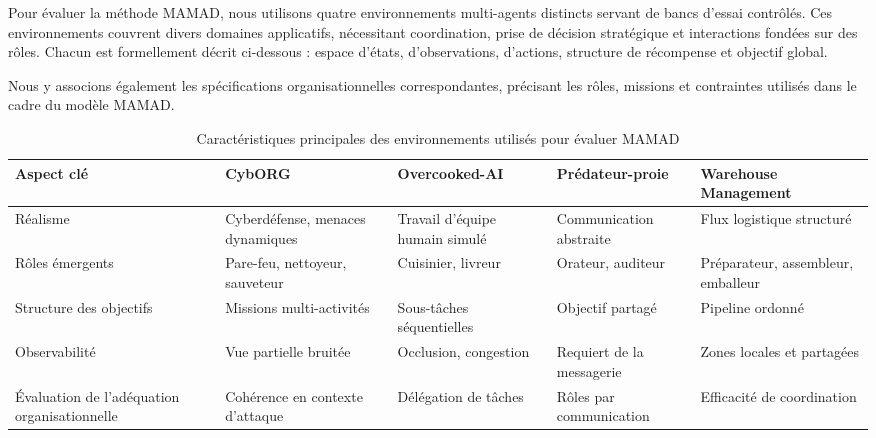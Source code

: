 Pour évaluer la méthode MAMAD, nous utilisons quatre environnements multi-agents distincts servant de bancs d'essai contrôlés. Ces environnements couvrent divers domaines applicatifs, nécessitant coordination, prise de décision stratégique et interactions fondées sur des rôles. Chacun est formellement décrit ci-dessous : espace d'états, d'observations, d'actions, structure de récompense et objectif global.

Nous y associons également les spécifications organisationnelles correspondantes, précisant les rôles, missions et contraintes utilisés dans le cadre du modèle MAMAD.

\vspace{0.5em}
\begin{table}[h!]
    \centering
    \begin{footnotesize}
        \renewcommand{\arraystretch}{1.3}
        \begin{tabular}{p{2.5cm}p{2.2cm}p{2.2cm}p{2.2cm}p{2.2cm}}
            \hline
            \textbf{Aspect clé}                          & \textbf{CybORG}                  & \textbf{Overcooked-AI}         & \textbf{Prédateur-proie}  & \textbf{Warehouse Management}      \\ \hline
            Réalisme                                     & Cyberdéfense, menaces dynamiques & Travail d'équipe humain simulé & Communication abstraite   & Flux logistique structuré          \\ \hline
            Rôles émergents                              & Pare-feu, nettoyeur, sauveteur   & Cuisinier, livreur             & Orateur, auditeur         & Préparateur, assembleur, emballeur \\ \hline
            Structure des objectifs                      & Missions multi-activités         & Sous-tâches séquentielles      & Objectif partagé          & Pipeline ordonné                   \\ \hline
            Observabilité                                & Vue partielle bruitée            & Occlusion, congestion          & Requiert de la messagerie & Zones locales et partagées         \\ \hline
            Évaluation de l'adéquation organisationnelle & Cohérence en contexte d'attaque  & Délégation de tâches           & Rôles par communication   & Efficacité de coordination         \\ \hline
        \end{tabular}
        \caption{Caractéristiques principales des environnements utilisés pour évaluer MAMAD}
        \label{tab:mamad_env_characteristics}
    \end{footnotesize}
\end{table}


